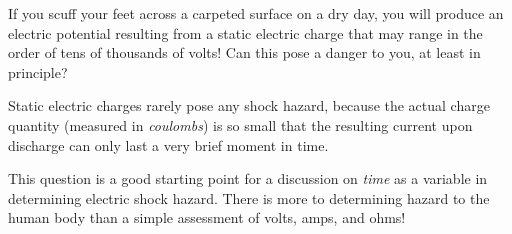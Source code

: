 

If you scuff your feet across a carpeted surface on a dry day, you will produce an electric potential resulting from a static electric charge that may range in the order of tens of thousands of volts!  Can this pose a danger to you, at least in principle?







Static electric charges rarely pose any shock hazard, because the actual charge quantity (measured in {\it coulombs}) is so small that the resulting current upon discharge can only last a very brief moment in time.







This question is a good starting point for a discussion on {\it time} as a variable in determining electric shock hazard.  There is more to determining hazard to the human body than a simple assessment of volts, amps, and ohms!




